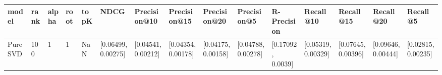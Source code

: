 \begin{tabular}{lllllllllllllll}
\toprule
   model & rank & alpha & root & topK &                NDCG &        Precision@10 &        Precision@15 &        Precision@20 &         Precision@5 &        R-Precision &           Recall@10 &           Recall@15 &           Recall@20 &            Recall@5 \\
\midrule
 PureSVD &  100 &     1 &    1 &  NaN &  [0.06499, 0.00275] &  [0.04541, 0.00212] &  [0.04354, 0.00178] &  [0.04175, 0.00158] &  [0.04788, 0.00278] &  [0.17092, 0.0039] &  [0.05319, 0.00329] &  [0.07645, 0.00396] &  [0.09646, 0.00444] &  [0.02815, 0.00235] \\
\bottomrule
\end{tabular}
